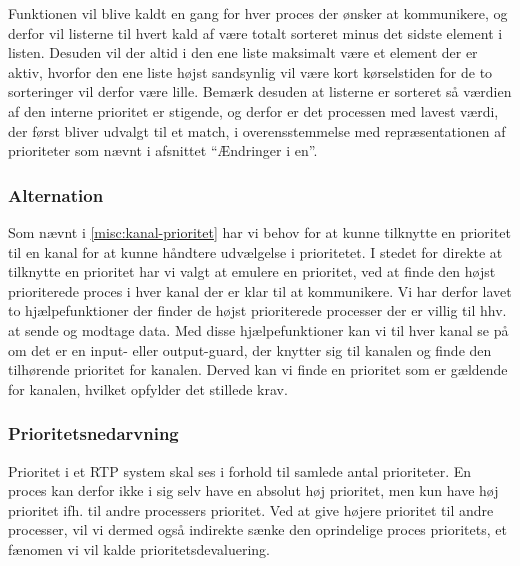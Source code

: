 Funktionen  vil blive kaldt en gang for hver proces der ønsker at kommunikere, og derfor vil listerne til hvert kald af  være totalt sorteret minus det sidste element i listen. Desuden vil der altid i den ene liste maksimalt være et element der er aktiv, hvorfor den ene liste højst sandsynlig vil være kort kørselstiden for de to sorteringer vil derfor være lille. Bemærk desuden at listerne er sorteret så værdien af den interne prioritet er stigende, og derfor er det processen med lavest værdi, der først bliver udvalgt til et match, i overensstemmelse med repræsentationen af prioriteter som nævnt i afsnittet ``Ændringer i \sched en''.

\subsubsection*{Alternation}
Som nævnt i \cref{misc:kanal-prioritet} har vi behov for at kunne tilknytte en prioritet til en kanal for at kunne håndtere udvælgelse i  prioritetet. I stedet for direkte at tilknytte en prioritet har vi valgt at emulere en prioritet, ved at finde den højst prioriterede proces i hver kanal der er klar til at kommunikere.  Vi har derfor lavet to hjælpefunktioner der finder de højst prioriterede processer der er villig til hhv. at sende og modtage data. Med disse hjælpefunktioner kan vi til hver kanal se på om det er en input- eller output-guard, der knytter sig til kanalen og finde den tilhørende prioritet for kanalen. Derved kan vi finde en prioritet som er gældende for kanalen, hvilket opfylder det stillede krav. 



\subsubsection*{Prioritetsnedarvning}
Prioritet i et RTP system skal ses i forhold til samlede antal prioriteter. En proces kan derfor ikke i sig selv have en absolut høj prioritet, men kun have høj prioritet ifh. til andre processers prioritet. Ved at give højere prioritet til andre processer, vil vi dermed også indirekte sænke den oprindelige proces prioritets, et fænomen vi vil kalde prioritetsdevaluering.

